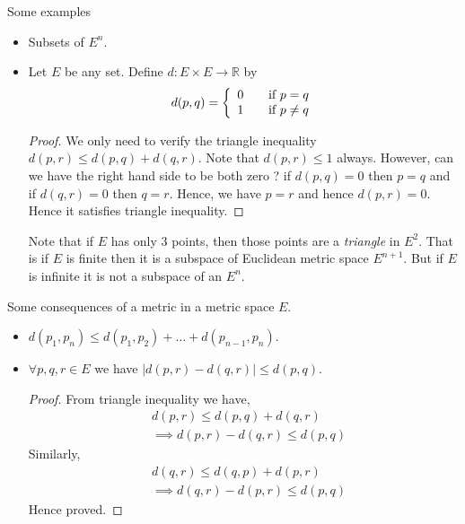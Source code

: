 Some examples
\begin{itemize}
    \item Subsets of $E^n$.
    \item Let $E$ be any set. Define $d: E \times E \rightarrow \mathbb{R}$ by 
    \begin{displaymath}
	d(p,q) = \left\{ 
	    \begin{array}{l l}
		0 & \quad \text{if $p = q$}\\
		1 & \quad \text{if $p \neq q$}
	    \end{array} \right.
    \end{displaymath}
    \begin{proof}
	We only need to verify the triangle inequality $d(p,r) \leq d(p,q) + d(q,r)$. Note that
	$d(p,r) \leq 1$ always. However, can we have the right hand side to be both zero ? if
	$d(p,q) = 0$ then $p = q$ and if $d(q,r) = 0$ then $q = r$. Hence, we have $p = r$ and hence
	$d(p,r) = 0$. Hence it satisfies triangle inequality.
    \end{proof}
    Note that if $E$ has only 3 points, then those points are a \emph{triangle} in $E^2$. That is 
    if $E$ is finite then it is a subspace of Euclidean metric space $E^{n+1}$. But if $E$ is
    infinite it is not a subspace of an $E^n$.
\end{itemize}
Some consequences of a metric in a metric space $E$.
\begin{itemize}
    \item $d(p_1,p_n) \leq d(p_1,p_2) + \dots + d(p_{n-1},p_{n})$.
    \item $\forall p,q,r \in E$ we have $\lvert d(p,r) - d(q,r) \rvert \leq d(p,q)$.
	\begin{proof}
	    From triangle inequality we have,
	    \begin{displaymath}
		\begin{aligned}
		    & d(p,r) \leq d(p,q) + d(q,r) \\
		    & \implies d(p,r) - d(q,r) \leq d(p,q)
		\end{aligned}
	    \end{displaymath}
	    Similarly,
	    \begin{displaymath}
		\begin{aligned}
		    & d(q,r) \leq d(q,p) + d(p,r) \\
		    & \implies d(q,r) - d(p,r) \leq d(p,q)
		\end{aligned}
	    \end{displaymath}
	    Hence proved.
	\end{proof}	    
\end{itemize}

